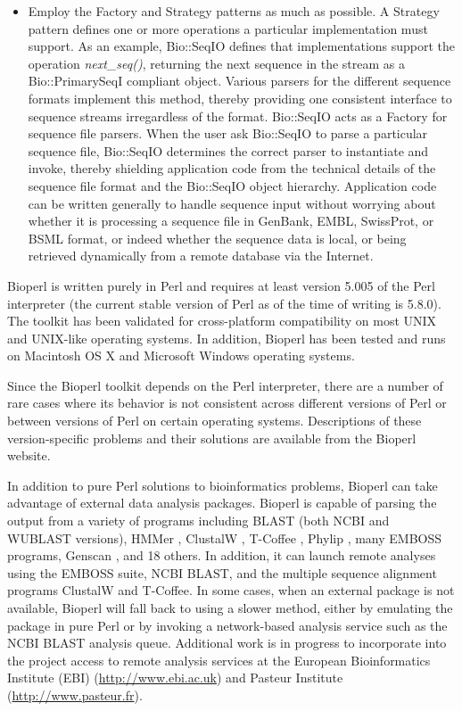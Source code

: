\documentclass[12pt]{article}
\begin{document}
\begin{itemize}
\item Employ the Factory and Strategy patterns \cite{gangoffour} as
much as possible. A Strategy pattern defines one or more operations a
particular implementation must support. As an example, Bio::SeqIO
defines that implementations support the operation
\textit{next\_seq()}, returning the next sequence in the stream as a
Bio::PrimarySeqI compliant object. Various parsers for the different
sequence formats implement this method, thereby providing one
consistent interface to sequence streams irregardless of the format.
Bio::SeqIO acts as a Factory for sequence file parsers.  When the user
ask Bio::SeqIO to parse a particular sequence file, Bio::SeqIO
determines the correct parser to instantiate and invoke, thereby
shielding application code from the technical details of the sequence
file format and the Bio::SeqIO object hierarchy. Application code can
be written generally to handle sequence input without worrying about
whether it is processing a sequence file in GenBank, EMBL, SwissProt,
or BSML format, or indeed whether the sequence data is local, or being
retrieved dynamically from a remote database via the Internet.
\end{itemize}


Bioperl is written purely in Perl and requires at least version 5.005
of the Perl interpreter (the current stable version of Perl as of the
time of writing is 5.8.0).  The toolkit has been validated for
cross-platform compatibility on most UNIX and UNIX-like operating
systems.  In addition, Bioperl has been tested and runs on Macintosh
OS X and Microsoft Windows operating systems.  

Since the Bioperl toolkit depends on the Perl interpreter, there are a
number of rare cases where its behavior is not consistent across
different versions of Perl or between versions of Perl on certain
operating systems.  Descriptions of these version-specific problems
and their solutions are available from the Bioperl website.

In addition to pure Perl solutions to bioinformatics problems, Bioperl
can take advantage of external data analysis packages.  Bioperl is
capable of parsing the output from a variety of programs including BLAST (both
NCBI and WUBLAST \cite{wublast} versions), HMMer \cite{hmmer}, 
ClustalW \cite{clustalw}, T-Coffee \cite{tcoffee}, 
Phylip \cite{phylip}, many EMBOSS \cite{emboss} programs, 
Genscan \cite{genscan}, and 18 others.
In addition, it can launch remote analyses using the EMBOSS
suite, NCBI BLAST, and the multiple sequence alignment
programs ClustalW and T-Coffee.  In
some cases, when an external package is not available, Bioperl will
fall back to using a slower method, either by emulating the package in
pure Perl or by invoking a network-based analysis service such as the
NCBI BLAST analysis queue.  Additional work is in progress to
incorporate into the project access to remote analysis services at the
European Bioinformatics Institute (EBI) (\url{http://www.ebi.ac.uk}) and
Pasteur Institute (\url{http://www.pasteur.fr}).
\end{document}
